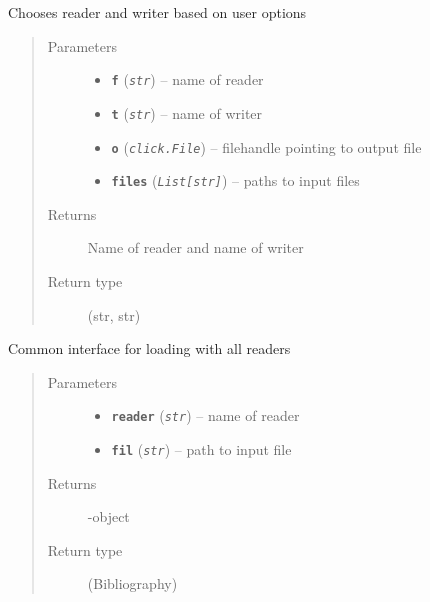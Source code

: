 \documentclass[letterpaper,10pt,english]{sphinxmanual}
\begin{document}
\begin{fulllineitems}
\label{scripts/pybibtools:scripts.pybibtools.get_formats}
Chooses reader and writer based on user options
\begin{quote}\begin{description}
\item[{Parameters}] \leavevmode\begin{itemize}
\item {} 
\textbf{\texttt{f}} (\emph{\texttt{str}}) -- name of reader

\item {} 
\textbf{\texttt{t}} (\emph{\texttt{str}}) -- name of writer

\item {} 
\textbf{\texttt{o}} (\emph{\texttt{click.File}}) -- filehandle pointing to output file

\item {} 
\textbf{\texttt{files}} (\emph{\texttt{List{[}str{]}}}) -- paths to input files

\end{itemize}

\item[{Returns}] \leavevmode
Name of reader and name of writer

\item[{Return type}] \leavevmode
(str, str)

\end{description}\end{quote}

\end{fulllineitems}


\begin{fulllineitems}
\label{scripts/pybibtools:scripts.pybibtools.load}
Common interface for loading with all readers
\begin{quote}\begin{description}
\item[{Parameters}] \leavevmode\begin{itemize}
\item {} 
\textbf{\texttt{reader}} (\emph{\texttt{str}}) -- name of reader

\item {} 
\textbf{\texttt{fil}} (\emph{\texttt{str}}) -- path to input file

\end{itemize}

\item[{Returns}] \leavevmode
{}-object

\item[{Return type}] \leavevmode
(Bibliography)

\end{description}\end{quote}

\end{fulllineitems}
\end{document}
